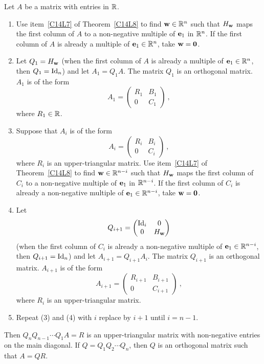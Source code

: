 \begin{algo}
Let $A$ be a  matrix with entries in $\mathbb{R}$.
\begin{enumerate}
\item  Use item~\ref{C14L7} of Theorem~\ref{C14L8} to find
$\mathbf{w} \in \mathbb{R}^n$ such that $H_{\mathbf{w}}$ maps the first column of $A$ to a
non-negative multiple of $\mathbf{e}_1$ in $\mathbb{R}^n$.  If the first column of $A$
is already a multiple of $\mathbf{e}_1 \in \mathbb{R}^n$, take $\mathbf{w}=\mathbf{0}$.
\item Let $Q_1 = H_{\mathbf{w}}$ (when the first column of $A$ is already a
multiple of $\mathbf{e}_1 \in \mathbb{R}^n$, then $Q_1 = \operatorname{Id}_n$) and let
$A_1 = Q_1 A$. 
The matrix $Q_1$ is an orthogonal matrix.  $A_1$ is of the form
\[
A_1 = \begin{pmatrix}
R_1 & B_1 \\
0 & C_1
\end{pmatrix} \ ,
\]
where $R_1 \in \mathbb{R}$.
\item Suppose that $A_i$ is of the form
\[
A_i = \begin{pmatrix}
R_i & B_i \\
0 & C_i
\end{pmatrix} \ ,
\]
where $R_i$ is an  upper-triangular matrix.  Use item~\ref{C14L7}
of Theorem~\ref{C14L8} to find $\mathbf{w} \in \mathbb{R}^{n-i}$ such that
$H_{\mathbf{w}}$ maps the first column of $C_i$ to a non-negative multiple of
$\mathbf{e}_1$ in $\mathbb{R}^{n-i}$.  If the first column of $C_i$ is already a
non-negative multiple of $\mathbf{e}_1 \in \mathbb{R}^{n-i}$, take $\mathbf{w} = \mathbf{0}$.
\item Let
\[
Q_{i+1} = \begin{pmatrix}
\operatorname{Id}_i & 0 \\
0 & H_{\mathbf{w}}
\end{pmatrix}
\]
(when the first column of $C_i$ is already a non-negative multiple of
$\mathbf{e}_1 \in \mathbb{R}^{n-i}$, then $Q_{i+1} = \operatorname{Id}_n$) and let
$A_{i+1} = Q_{i+1} A_i$.  The matrix $Q_{i+1}$ is an orthogonal matrix.
$A_{i+1}$ is of the form
\[
A_{i+1} = \begin{pmatrix}
R_{i+1} & B_{i+1} \\
0 & C_{i+1}
\end{pmatrix} \ ,
\]
where $R_i$ is an  upper-triangular matrix.
\item Repeat (3) and (4) with $i$ replace by $i+1$ until $i=n-1$.
\end{enumerate}
Then $Q_n Q_{n-1} \cdots Q_1 A = R$ is an upper-triangular matrix with
non-negative entries on the main diagonal.  If
$Q = Q_1 Q_2 \cdots Q_n$, then $Q$ is an orthogonal matrix such that
$A = Q R$.
\label{C14L9}
\end{algo}


